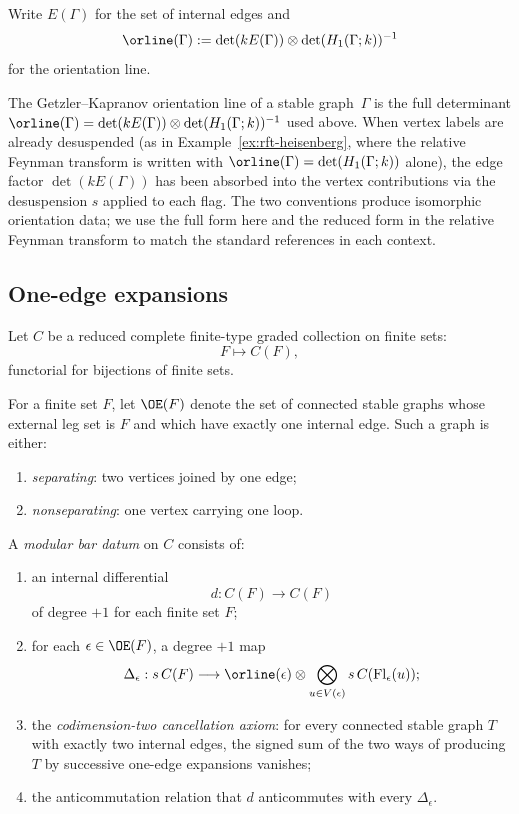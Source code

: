 Write $E(\Gamma)$ for the set of internal edges and
\[
\orline(\Gamma):=\det(kE(\Gamma))\otimes \det(H_1(\Gamma;k))^{-1}
\]
for the orientation line.

\begin{remark}
\label{rem:orientation-line-conventions}
The Getzler--Kapranov orientation line of a stable graph~$\Gamma$
is the full determinant
$\orline(\Gamma) = \det(kE(\Gamma)) \otimes \det(H_1(\Gamma;k))^{-1}$
used above.
When vertex labels are already desuspended (as in
Example~\ref{ex:rft-heisenberg}, where the relative Feynman
transform is written with $\orline(\Gamma) = \det(H_1(\Gamma;k))$
alone), the edge factor $\det(kE(\Gamma))$ has been absorbed into
the vertex contributions via the desuspension $s$ applied to each
flag. The two conventions produce isomorphic orientation data;
we use the full form here and the reduced form in the relative
Feynman transform to match the standard references in each
context.
\end{remark}

\subsection{One-edge expansions}

Let $C$ be a reduced complete finite-type graded collection on finite sets:
\[
F\longmapsto C(F),
\]
functorial for bijections of finite sets.

\begin{definition}
For a finite set $F$, let $\OE(F)$ denote the set of connected stable graphs whose
external leg set is $F$ and which have exactly one internal edge. Such a graph is either:
\begin{enumerate}[leftmargin=2.4em]
\item \emph{separating}: two vertices joined by one edge;
\item \emph{nonseparating}: one vertex carrying one loop.
\end{enumerate}
\end{definition}

\begin{definition}
\label{def:modular-bar-datum}
A \emph{modular bar datum} on $C$ consists of:
\begin{enumerate}[leftmargin=2.4em]
\item an internal differential
\[
d:C(F)\to C(F)
\]
of degree $+1$ for each finite set $F$;
\item for each $\epsilon\in \OE(F)$, a degree $+1$ map
\[
\Delta_\epsilon:
s\,C(F)\longrightarrow
\orline(\epsilon)\otimes \bigotimes_{u\in V(\epsilon)} s\,C(\mathrm{Fl}_\epsilon(u));
\]
\item the \emph{codimension-two cancellation axiom}: for every connected stable graph
$T$ with exactly two internal edges, the signed sum of the two ways of producing $T$
by successive one-edge expansions vanishes;
\item the anticommutation relation that $d$ anticommutes with every $\Delta_\epsilon$.
\end{enumerate}
\end{definition}

